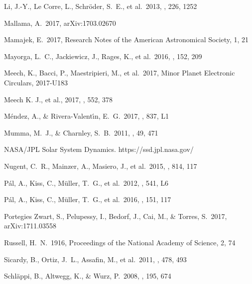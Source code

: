 \documentclass[a4paper,fleqn,usenatbib]{mnras}
\begin{document}
\begin{thebibliography}{99}
 Li, J.-Y., Le Corre, L., Schr{\"o}der, S.~E., et al.\ 2013, \icarus, 226, 1252 

 Mallama, A.\ 2017, arXiv:1703.02670 

 Mamajek, E.\ 2017, Research Notes of the American Astronomical Society, 1, 21 

 Mayorga, L.~C., Jackiewicz, J., Rages, K., et al.\ 2016, \aj, 152, 209 

 Meech, K., Bacci, P., Maestripieri, M., et al.\ 2017, Minor Planet Electronic Circulars, 2017-U183

 Meech K. J., et al., 2017, \nat, 552, 378

 M{\'e}ndez, A., \& Rivera-Valent{\'{\i}}n, E.~G.\ 2017, \apjl, 837, L1 

 Mumma, M.~J., \& Charnley, S.~B.\ 2011, \araa, 49, 471 

 NASA/JPL Solar System Dynamics. https://ssd.jpl.nasa.gov/

 Nugent, C.~R., Mainzer, A., Masiero, J., et al.\ 2015, \apj, 814, 117 

 P{\'a}l, A., Kiss, C., M{\"u}ller, T.~G., et al.\ 2012, \aap, 541, L6 

 P{\'a}l, A., Kiss, C., M{\"u}ller, T.~G., et al.\ 2016, \aj, 151, 117 

 Portegies Zwart, S., Pelupessy, I., Bedorf, J., Cai, M., \& Torres, S.\ 2017, arXiv:1711.03558

 Russell, H.~N.\ 1916, Proceedings of the National Academy of Science, 2, 74 

 Sicardy, B., Ortiz, J.~L., Assafin, M., et al.\ 2011, \nat, 478, 493 

 Schl{\"a}ppi, B., Altwegg, K., \& Wurz, P.\ 2008, \icarus, 195, 674 


\end{thebibliography}
\end{document}
